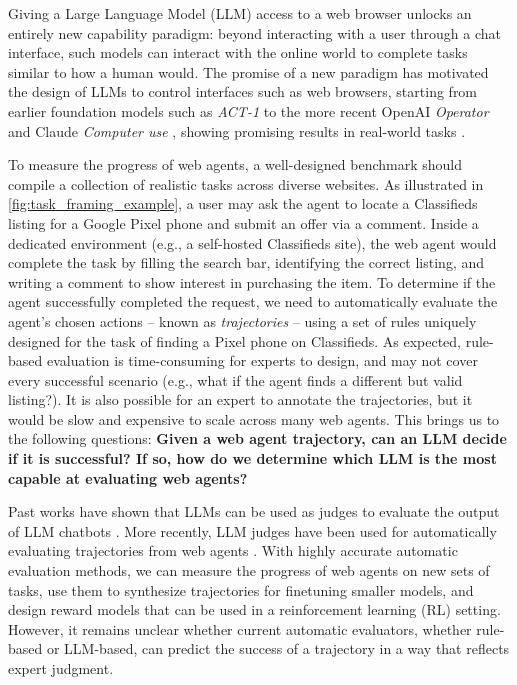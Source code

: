 \documentclass{article} %
\begin{document}
Giving a Large Language Model (LLM) access to a web browser unlocks an entirely new capability paradigm: beyond interacting with a user through a chat interface, such models can interact with the online world to complete tasks similar to how a human would. The promise of a new paradigm has motivated the design of LLMs to control interfaces such as web browsers, starting from earlier foundation models such as \textit{ACT-1} \citep{adept_act_1} to the more recent OpenAI \textit{Operator} \citep{OpenAI_Operator_2025} and Claude \textit{Computer use} \citep{Anthropic_Computer_Use_2024}, showing promising results in real-world tasks \citep{zhou_webarena_2024}.




To measure the progress of web agents, a well-designed benchmark should compile a collection of realistic tasks across diverse websites. As illustrated in \cref{fig:task_framing_example}, a user may ask the agent to locate a Classifieds listing for a Google Pixel phone and submit an offer via a comment. Inside a dedicated environment (e.g., a self-hosted Classifieds site), the web agent would complete the task by filling the search bar, identifying the correct listing, and writing a comment to show interest in purchasing the item. To determine if the agent successfully completed the request, we need to automatically evaluate the agent's chosen actions -- known as \textit{trajectories} -- using a set of rules uniquely designed for the task of finding a Pixel phone on Classifieds. As expected, rule-based evaluation is time-consuming for experts to design, and may not cover every successful scenario (e.g., what if the agent finds a different but valid listing?). It is also possible for an expert to annotate the trajectories, but it would be slow and expensive to scale across many web agents. This brings us to the following questions: \textbf{Given a web agent trajectory, can an LLM decide if it is successful? If so, how do we determine which LLM is the most capable at evaluating web agents?}

Past works have shown that LLMs can be used as judges to evaluate the output of LLM chatbots \citep{zheng2023judgingllmasajudgemtbenchchatbot}. More recently, LLM judges have been used for automatically evaluating trajectories from web agents \citep{AER_pan2024,nnetnav_murty2025,insta_trabucco2025}. 
With highly accurate automatic evaluation methods, we can measure the progress of web agents on new sets of tasks, use them to synthesize trajectories for finetuning smaller models, and design reward models that can be used in a reinforcement learning (RL) setting.
However, it remains unclear whether current automatic evaluators, whether rule-based or LLM-based, can predict the success of a trajectory in a way that reflects expert judgment.
\end{document}
